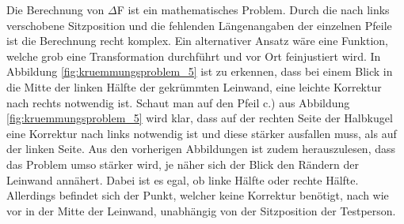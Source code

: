 Die Berechnung von $\Delta$F ist ein mathematisches Problem. Durch die nach links verschobene Sitzposition und die fehlenden Längenangaben der einzelnen Pfeile ist die Berechnung recht komplex. Ein alternativer Ansatz wäre eine Funktion, welche grob eine Transformation durchführt und vor Ort feinjustiert wird. In Abbildung \ref{fig:kruemmungsproblem_5} ist zu erkennen, dass bei einem Blick in die Mitte der linken Hälfte der gekrümmten Leinwand, eine leichte Korrektur nach rechts notwendig ist. Schaut man auf den Pfeil c.) aus Abbildung \ref{fig:kruemmungsproblem_5} wird klar, dass auf der rechten Seite der Halbkugel eine Korrektur nach links notwendig ist und diese stärker ausfallen muss, als auf der linken Seite. Aus den vorherigen Abbildungen ist zudem herauszulesen, dass das Problem umso stärker wird, je näher sich der Blick den Rändern der Leinwand annähert. Dabei ist es egal, ob linke Hälfte oder rechte Hälfte. 
Allerdings befindet sich der Punkt, welcher keine Korrektur benötigt, nach wie vor in der Mitte der Leinwand, unabhängig von der Sitzposition der Testperson.

